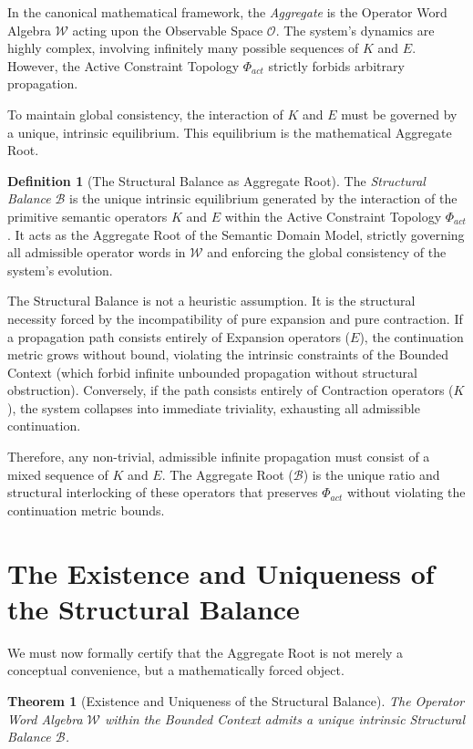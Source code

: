 \documentclass[12pt,openany]{extbook}
\theoremstyle{plain}
\newtheorem{theorem}{Theorem}[chapter]
\theoremstyle{definition}
\newtheorem{definition}{Definition}[chapter]
\begin{document}
In the canonical mathematical framework, the \emph{Aggregate} is the Operator Word Algebra $\mathcal{W}$ acting upon the Observable Space $\mathcal{O}$. The system's dynamics are highly complex, involving infinitely many possible sequences of $K$ and $E$. However, the Active Constraint Topology $\Phi_{act}$ strictly forbids arbitrary propagation. 

To maintain global consistency, the interaction of $K$ and $E$ must be governed by a unique, intrinsic equilibrium. This equilibrium is the mathematical Aggregate Root.

\begin{definition}[The Structural Balance as Aggregate Root]
The \emph{Structural Balance} $\mathcal{B}$ is the unique intrinsic equilibrium generated by the interaction of the primitive semantic operators $K$ and $E$ within the Active Constraint Topology $\Phi_{act}$. It acts as the Aggregate Root of the Semantic Domain Model, strictly governing all admissible operator words in $\mathcal{W}$ and enforcing the global consistency of the system's evolution.
\end{definition}

The Structural Balance is not a heuristic assumption. It is the structural necessity forced by the incompatibility of pure expansion and pure contraction. If a propagation path consists entirely of Expansion operators ($E$), the continuation metric grows without bound, violating the intrinsic constraints of the Bounded Context (which forbid infinite unbounded propagation without structural obstruction). Conversely, if the path consists entirely of Contraction operators ($K$), the system collapses into immediate triviality, exhausting all admissible continuation. 

Therefore, any non-trivial, admissible infinite propagation must consist of a mixed sequence of $K$ and $E$. The Aggregate Root ($\mathcal{B}$) is the unique ratio and structural interlocking of these operators that preserves $\Phi_{act}$ without violating the continuation metric bounds.

\section{The Existence and Uniqueness of the Structural Balance}

We must now formally certify that the Aggregate Root is not merely a conceptual convenience, but a mathematically forced object.

\begin{theorem}[Existence and Uniqueness of the Structural Balance]
The Operator Word Algebra $\mathcal{W}$ within the Bounded Context admits a unique intrinsic Structural Balance $\mathcal{B}$.
\end{theorem}
\end{document}
